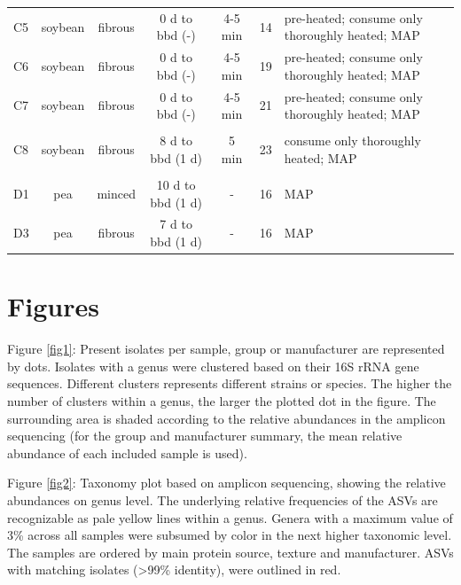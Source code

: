 \documentclass[preprint, 3p,
authoryear]{elsarticle} %
\begin{document}
\begin{ThreePartTable}
\begin{longtable}[b]{lccccc>{\raggedright\arraybackslash}p{12em}}
\hspace{1em}C5 & soybean & fibrous & 0 d to bbd (-) & 4-5 min & 14 & pre-heated; consume only thoroughly heated; MAP\\
\hspace{1em}C6 & soybean & fibrous & 0 d to bbd (-) & 4-5 min & 19 & pre-heated; consume only thoroughly heated; MAP\\
\hspace{1em}C7 & soybean & fibrous & 0 d to bbd (-) & 4-5 min & 21 & pre-heated; consume only thoroughly heated; MAP\\
\addlinespace[0.3em]
\multicolumn{7}{l}{\textit{Manufacturer 08}}\\
\hspace{1em}C8 & soybean & fibrous & 8 d to bbd (1 d) & 5 min & 23 & consume only thoroughly heated; MAP\\
\addlinespace[0.3em]
\multicolumn{7}{l}{\textit{Manufacturer 09}}\\
\hspace{1em}D1 & pea & minced & 10 d to bbd (1 d) & - & 16 & MAP\\
\hspace{1em}D3 & pea & fibrous & 7 d to bbd (1 d) & - & 16 & MAP\\*
\end{longtable}
\end{ThreePartTable}

\doublespacing

\hypertarget{figures}{%
\section{Figures}\label{figures}}

Figure \ref{fig1}: Present isolates per sample, group or manufacturer
are represented by dots. Isolates with a genus were clustered based on
their 16S rRNA gene sequences. Different clusters represents different
strains or species. The higher the number of clusters within a genus,
the larger the plotted dot in the figure. The surrounding area is shaded
according to the relative abundances in the amplicon sequencing (for the
group and manufacturer summary, the mean relative abundance of each
included sample is used).

Figure \ref{fig2}: Taxonomy plot based on amplicon sequencing, showing
the relative abundances on genus level. The underlying relative
frequencies of the ASVs are recognizable as pale yellow lines within a
genus. Genera with a maximum value of 3\% across all samples were
subsumed by color in the next higher taxonomic level. The samples are
ordered by main protein source, texture and manufacturer. ASVs with
matching isolates (\textgreater99\% identity), were outlined in red.
\end{document}
